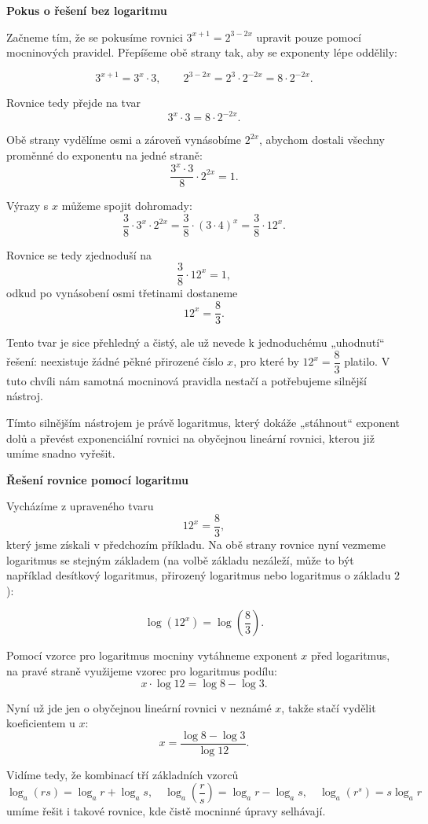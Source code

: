 \documentclass[12pt,a4paper]{article}
\begin{document}
\begin{examplebox}
\textbf{Pokus o řešení bez logaritmu}

Začneme tím, že se pokusíme rovnici $3^{x+1} = 2^{3-2x}$ upravit pouze pomocí
mocninových pravidel. Přepíšeme obě strany tak, aby se exponenty lépe oddělily:

\[
3^{x+1} = 3^x \cdot 3,\qquad
2^{3-2x} = 2^3 \cdot 2^{-2x} = 8 \cdot 2^{-2x}.
\]

Rovnice tedy přejde na tvar
\[
3^x \cdot 3 = 8 \cdot 2^{-2x}.
\]

Obě strany vydělíme osmi a zároveň vynásobíme $2^{2x}$, abychom dostali všechny
proměnné do exponentu na jedné straně:
\[
\frac{3^x \cdot 3}{8} \cdot 2^{2x} = 1.
\]

Výrazy s $x$ můžeme spojit dohromady:
\[
\frac{3}{8} \cdot 3^x \cdot 2^{2x}
=
\frac{3}{8} \cdot (3 \cdot 4)^x
=
\frac{3}{8} \cdot 12^x.
\]

Rovnice se tedy zjednoduší na
\[
\frac{3}{8} \cdot 12^x = 1,
\]
odkud po vynásobení osmi třetinami dostaneme
\[
12^x = \frac{8}{3}.
\]

Tento tvar je sice přehledný a čistý, ale už nevede k jednoduchému „uhodnutí“ řešení:
neexistuje žádné pěkné přirozené číslo $x$, pro které by $12^x = \dfrac{8}{3}$ platilo.
V tuto chvíli nám samotná mocninová pravidla nestačí a potřebujeme silnější nástroj.
\end{examplebox}

Tímto silnějším nástrojem je právě logaritmus, který dokáže „stáhnout“ exponent dolů
a převést exponenciální rovnici na obyčejnou lineární rovnici, kterou již umíme snadno
vyřešit.

\begin{examplebox}
\textbf{Řešení rovnice pomocí logaritmu}

Vycházíme z upraveného tvaru
\[
12^x = \frac{8}{3},
\]
který jsme získali v předchozím příkladu. Na obě strany rovnice nyní vezmeme
logaritmus se stejným základem (na volbě základu nezáleží, může to být například
desítkový logaritmus, přirozený logaritmus nebo logaritmus o základu $2$):

\[
\log\left(12^x\right) = \log\left(\frac{8}{3}\right).
\]

Pomocí vzorce pro logaritmus mocniny vytáhneme exponent $x$ před logaritmus,
na pravé straně využijeme vzorec pro logaritmus podílu:
\[
x \cdot \log 12
=
\log 8 - \log 3.
\]

Nyní už jde jen o obyčejnou lineární rovnici v neznámé $x$, takže stačí vydělit
koeficientem u $x$:
\[
x = \frac{\log 8 - \log 3}{\log 12}.
\]


Vidíme tedy, že kombinací tří základních vzorců
\[
\log_a(rs) = \log_a r + \log_a s,\quad
\log_a\left(\frac{r}{s}\right) = \log_a r - \log_a s,\quad
\log_a(r^s) = s \log_a r
\]
umíme řešit i takové rovnice, kde čistě mocninné úpravy selhávají.
\end{examplebox}
\end{document}
